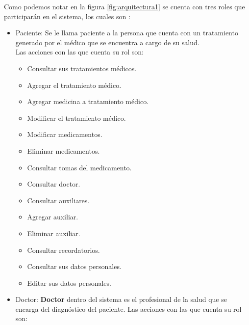 Como podemos notar en la figura \ref{fig:arquitectura1} se cuenta con tres roles que participarán en el sistema, los cuales son :
\begin{itemize}

	\item Paciente: Se le llama paciente a la persona que cuenta con un tratamiento generado por el médico que se encuentra a cargo de su salud.\\
	
	Las acciones con las que cuenta su rol son:
	\begin{itemize}
		\item Consultar sus tratamientos médicos.
		\item Agregar el tratamiento médico.
		\item Agregar medicina a tratamiento médico.
		\item Modificar el tratamiento médico.
		\item Modificar medicamentos.
		\item Eliminar medicamentos.
		\item Consultar tomas del medicamento.
		\item Consultar doctor.
		\item Consultar auxiliares.
		\item Agregar auxiliar.
		\item Eliminar auxiliar.
		\item Consultar recordatorios.
		\item Consultar sus datos personales.
		\item Editar sus datos personales.
	\end{itemize}

	\item Doctor: \textbf{Doctor} dentro del sistema es el profesional de la salud que se encarga del diagnóstico del paciente.
	Las acciones con las que cuenta su rol son:
		\begin{itemize}
			

\end{itemize}
\end{itemize}
